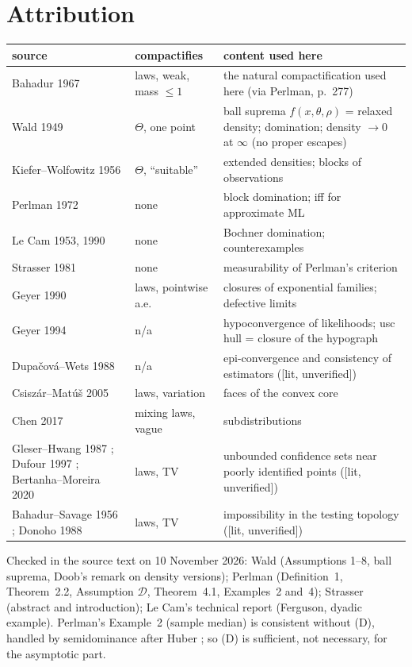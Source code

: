 \documentclass[11pt]{article}
\newcommand{\status}[1]{\textsf{[#1]}}
\theoremstyle{definition}
\theoremstyle{remark}
\begin{document}
\section{Attribution}\label{sec:attribution}
\begin{center}\small
\begin{tabular}{@{}p{3.6cm}p{3.2cm}p{7.4cm}@{}}
\toprule
source & compactifies & content used here\\
\midrule
Bahadur 1967 \cite{bahadur67} & laws, weak, mass $\le1$ & the natural compactification used here (via Perlman, p.~277)\\
Wald 1949 \cite{wald} & $\Theta$, one point & ball suprema $f(x,\theta,\rho)$ = relaxed density; domination; density $\to0$ at $\infty$ (no proper escapes)\\
Kiefer--Wolfowitz 1956 \cite{kw} & $\Theta$, ``suitable'' & extended densities; blocks of observations\\
Perlman 1972 \cite{perlman} & none & block domination; iff for approximate ML\\
Le Cam 1953, 1990 \cite{lecam} & none & Bochner domination; counterexamples\\
Strasser 1981 \cite{strasser} & none & measurability of Perlman's criterion\\
Geyer 1990 \cite{geyer} & laws, pointwise a.e. & closures of exponential families; defective limits\\
Geyer 1994 \cite{geyer94} & n/a & hypoconvergence of likelihoods; usc hull = closure of the hypograph\\
Dupa\v cov\'a--Wets 1988 \cite{dw} & n/a & epi-convergence and consistency of estimators (\status{lit, unverified})\\
Csisz\'ar--Mat\'u\v s 2005 \cite{cm} & laws, variation & faces of the convex core\\
Chen 2017 \cite{chen} & mixing laws, vague & subdistributions\\
Gleser--Hwang 1987 \cite{gleserhwang}; Dufour 1997 \cite{dufour}; Bertanha--Moreira 2020 \cite{bertanhamoreira} & laws, TV & unbounded confidence sets near poorly identified points (\status{lit, unverified})\\
Bahadur--Savage 1956 \cite{bahadursavage}; Donoho 1988 \cite{donoho88} & laws, TV & impossibility in the testing topology (\status{lit, unverified})\\
\bottomrule
\end{tabular}
\end{center}
Checked in the source text on 10 November 2026: Wald (Assumptions 1--8,
ball suprema, Doob's remark on density versions); Perlman (Definition~1,
Theorem~2.2, Assumption $\mathcal D$, Theorem~4.1, Examples~2 and~4);
Strasser (abstract and introduction); Le Cam's technical report (Ferguson,
dyadic example). Perlman's Example~2 (sample median) is consistent without
(D), handled by semidominance after Huber \cite{huber}; so (D) is
sufficient, not necessary, for the asymptotic part.
\end{document}
